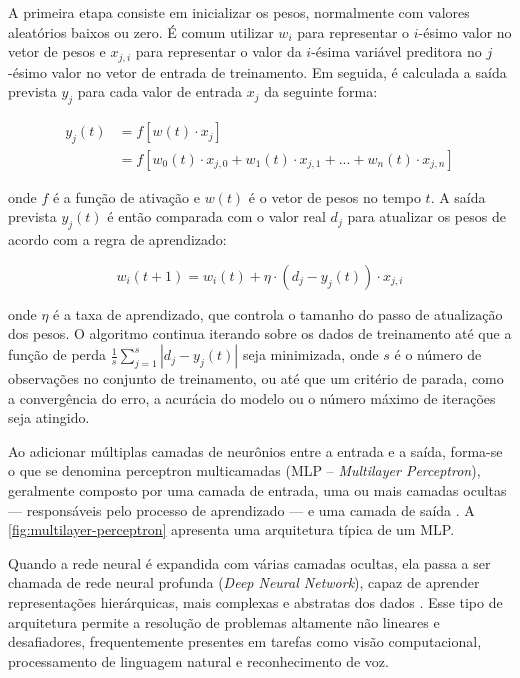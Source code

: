 A primeira etapa consiste em inicializar os pesos, normalmente com valores aleatórios baixos ou zero. É comum utilizar $w_i$ para representar o $i$-ésimo valor no vetor de pesos e $x_{j,i}$ para representar o valor da $i$-ésima variável preditora no $j$-ésimo valor no vetor de entrada de treinamento. Em seguida, é calculada a saída prevista $y_j$ para cada valor de entrada $x_j$ da seguinte forma:

\begin{equation}
    \begin{split}
        y_j(t) &= f[w(t) \cdot x_j] \\
        &= f[w_0(t) \cdot x_{j,0} + w_1(t) \cdot x_{j,1} + ... + w_n(t) \cdot x_{j,n}]
    \end{split}
\end{equation}

onde $f$ é a função de ativação e $w(t)$ é o vetor de pesos no tempo $t$. A saída prevista $y_j(t)$ é então comparada com o valor real $d_j$ para atualizar os pesos de acordo com a regra de aprendizado:

\begin{equation}
    w_i(t+1) = w_i(t) + \eta \cdot (d_j - y_j(t)) \cdot x_{j,i}
\end{equation}

onde $\eta$ é a taxa de aprendizado, que controla o tamanho do passo de atualização dos pesos. O algoritmo continua iterando sobre os dados de treinamento até que a função de perda $\frac{1}{s} \sum_{j=1}^{s} |d_j - y_j(t)|$ seja minimizada, onde $s$ é o número de observações no conjunto de treinamento, ou até que um critério de parada, como a convergência do erro, a acurácia do modelo ou o número máximo de iterações seja atingido.


Ao adicionar múltiplas camadas de neurônios entre a entrada e a saída, forma-se o que se denomina perceptron multicamadas (MLP – \textit{Multilayer Perceptron}), geralmente composto por uma camada de entrada, uma ou mais camadas ocultas — responsáveis pelo processo de aprendizado — e uma camada de saída \citep{Sarker2021}. A \autoref{fig:multilayer-perceptron} apresenta uma arquitetura típica de um MLP.

Quando a rede neural é expandida com várias camadas ocultas, ela passa a ser chamada de rede neural profunda (\textit{Deep Neural Network}), capaz de aprender representações hierárquicas, mais complexas e abstratas dos dados \citep{AurlienGron2019}. Esse tipo de arquitetura permite a resolução de problemas altamente não lineares e desafiadores, frequentemente presentes em tarefas como visão computacional, processamento de linguagem natural e reconhecimento de voz.

